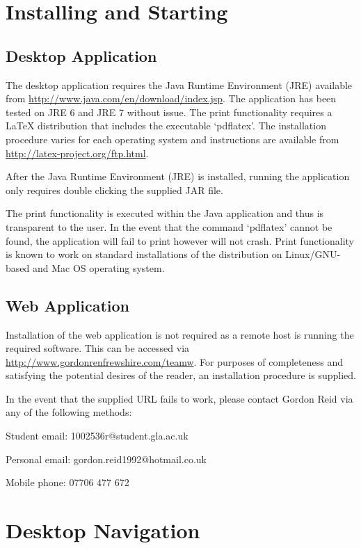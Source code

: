 \section{Installing and Starting}

\subsection{Desktop Application}

The desktop application requires the Java Runtime Environment (JRE) available
from \url{http://www.java.com/en/download/index.jsp}. The application has been
tested on JRE 6 and JRE 7 without issue. The print functionality requires a
LaTeX distribution that includes the executable `pdflatex'. The installation
procedure varies for each operating system and instructions are available from
\url{http://latex-project.org/ftp.html}.

After the Java Runtime Environment (JRE) is installed, running the application
only requires double clicking the supplied JAR file.

The print functionality is executed within the Java application and thus is
transparent to the user. In the event that the command `pdflatex' cannot be
found, the application will fail to print however will not crash. Print
functionality is known to work on standard installations of the distribution on
Linux/GNU-based and Mac OS operating system.

\subsection{Web Application}

Installation of the web application is not required as a remote host is running
the required software. This can be accessed via
\url{http://www.gordonrenfrewshire.com/teamw}. For purposes of completeness and
satisfying the potential desires of the reader, an installation procedure is
supplied.

In the event that the supplied URL fails to work, please contact Gordon Reid via
any of the following methods:

Student email: 1002536r@student.gla.ac.uk

Personal email: gordon.reid1992@hotmail.co.uk

Mobile phone: 07706 477 672

\section{Desktop Navigation}

